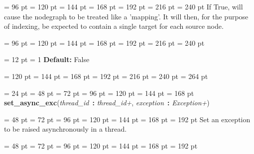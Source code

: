 {{{{{{{{\par \noindent  \leftskip = 96 pt  \leftmargini = 120 pt  \leftmarginii = 144 pt  \leftmarginiii = 168 pt  \leftmarginiv = 192 pt  \leftmarginv = 216 pt  \leftmarginvi = 240 pt  If True, will cause the nodegraph
         to be treated like a 'mapping'. It will then, for the
         purpose of indexing, be expected to contain a single
         target for each source node.\par}
{\par \noindent  \leftskip = 96 pt  \leftmargini = 120 pt  \leftmarginii = 144 pt  \leftmarginiii = 168 pt  \leftmarginiv = 192 pt  \leftmarginv = 216 pt  \leftmarginvi = 240 pt {\par \noindent
{\par \pagebreak[2.900000] \noindent \hangindent = 12 pt \hangafter = 1 
{\bf Default: \/}False\par}
{\par \noindent  \leftskip = 120 pt  \leftmargini = 144 pt  \leftmarginii = 168 pt  \leftmarginiii = 192 pt  \leftmarginiv = 216 pt  \leftmarginv = 240 pt  \leftmarginvi = 264 pt \par}
\par}
\par}
\par}
\par}
\par}
\par}
\par}
\par}
{\par \noindent  \leftskip = 24 pt  \leftmargini = 48 pt  \leftmarginii = 72 pt  \leftmarginiii = 96 pt  \leftmarginiv = 120 pt  \leftmarginv = 144 pt  \leftmarginvi = 168 pt {\bf {\large {\bf set{\_}async{\_}exc\/}}\/}({\em thread{\_}id\/}~{\bf :}  {\em thread{\_}id+\/}, {\em exception\/}~{\bf :}  {\em Exception+\/}){\par \noindent
{\par \noindent  \leftskip = 48 pt  \leftmargini = 72 pt  \leftmarginii = 96 pt  \leftmarginiii = 120 pt  \leftmarginiv = 144 pt  \leftmarginv = 168 pt  \leftmarginvi = 192 pt  Set an exception to be raised asynchronously in a thread.\par}
{\par \noindent  \leftskip = 48 pt  \leftmargini = 72 pt  \leftmarginii = 96 pt  \leftmarginiii = 120 pt  \leftmarginiv = 144 pt  \leftmarginv = 168 pt  \leftmarginvi = 192 pt {\par \noindent
\par}
}}}}
